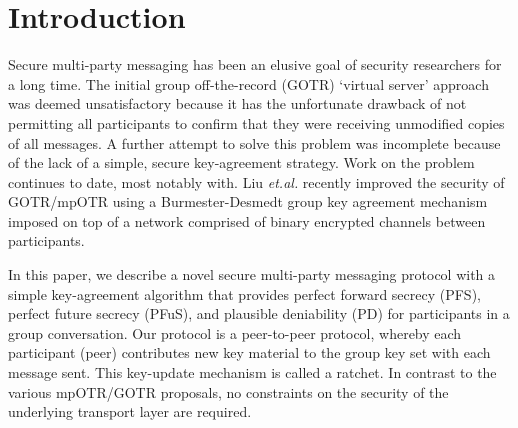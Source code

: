 \documentclass[%
preprint,
amsmath,amssymb,
aps,
prb,
floatfix,
]{revtex4-1}
\begin{document}
\section{\label{sec:Introduction}Introduction}
Secure multi-party messaging has been an elusive goal of security researchers
for a long time. The initial group off-the-record (GOTR) `virtual server'
approach\cite{ref:bian} was deemed unsatisfactory
because it has the unfortunate drawback of not permitting all participants to
confirm that they were receiving unmodified copies of all messages.
A further attempt to solve this problem\cite{ref:goldberg} was incomplete
because of the lack of a simple, secure key-agreement
strategy. Work on the problem
continues to date, most notably with\cite{ref:cryptocat}.
Liu \textit{et.al.}\cite{ref:liu}
recently improved the security of GOTR/mpOTR using a Burmester-Desmedt group
key agreement mechanism imposed on top of a network comprised of binary
encrypted channels between participants.

In this paper, we describe a novel secure multi-party messaging protocol with a
simple key-agreement algorithm that provides perfect forward secrecy (PFS),
perfect future secrecy (PFuS),
and plausible deniability (PD) for participants in a group conversation. Our protocol
is a peer-to-peer protocol, whereby each participant (peer) contributes new
key material to the group key set with each message sent.
This key-update mechanism is called a ratchet.
In contrast to the various mpOTR/GOTR proposals, no constraints on the security
of the underlying transport layer are required.
\end{document}
